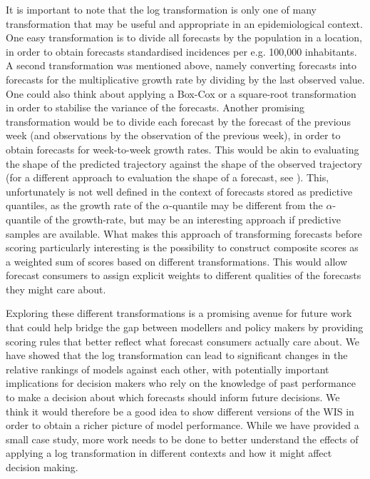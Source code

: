 \documentclass{article}
\begin{document}
It is important to note that the log transformation is only one of many transformation that may be useful and appropriate in an epidemiological context. One easy transformation is to divide all forecasts by the population in a location, in order to obtain forecasts standardised incidences per e.g. 100,000 inhabitants. A second transformation was mentioned above, namely converting forecasts into forecasts for the multiplicative growth rate by dividing by the last observed value. One could also think about applying a Box-Cox or a square-root transformation in order to stabilise the variance of the forecasts. Another promising transformation would be to divide each forecast by the forecast of the previous week (and observations by the observation of the previous week), in order to obtain forecasts for week-to-week growth rates. This would be akin to evaluating the shape of the predicted trajectory against the shape of the observed trajectory (for a different approach to evaluation the shape of a forecast, see \citep{srivastavaShapebasedEvaluationEpidemic2022}). This, unfortunately is not well defined in the context of forecasts stored as predictive quantiles, as the growth rate of the $\alpha$-quantile may be different from the $\alpha$-quantile of the growth-rate, but may be an interesting approach if predictive samples are available. What makes this approach of transforming forecasts before scoring particularly interesting is the possibility to construct composite scores as a weighted sum of scores based on different transformations. This would allow forecast consumers to assign explicit weights to different qualities of the forecasts they might care about. 

Exploring these different transformations is a promising avenue for future work that could help bridge the gap between modellers and policy makers by providing scoring rules that better reflect what forecast consumers actually care about. We have showed that the log transformation can lead to significant changes in the relative rankings of models against each other, with potentially important implications for decision makers who rely on the knowledge of past performance to make a decision about which forecasts should inform future decisions. We think it would therefore be a good idea to show different versions of the WIS in order to obtain a richer picture of model performance. While we have provided a small case study, more work needs to be done to better understand the effects of applying a log transformation in different contexts and how it might affect decision making. 
\end{document}
